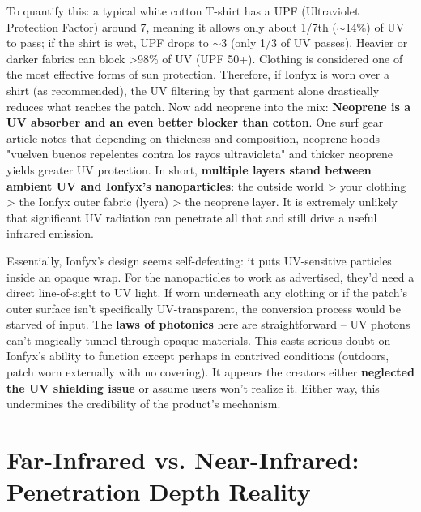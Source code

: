 \documentclass{article}
\begin{document}
To quantify this: a typical white cotton T-shirt has a UPF (Ultraviolet Protection Factor) around 7, meaning it allows only about 1/7th ($\sim$14\%) of UV to pass; if the shirt is wet, UPF drops to $\sim$3 (only 1/3 of UV passes). Heavier or darker fabrics can block >98\% of UV (UPF 50+). Clothing is considered one of the most effective forms of sun protection. Therefore, if Ionfyx is worn over a shirt (as recommended), the UV filtering by that garment alone drastically reduces what reaches the patch. Now add neoprene into the mix: \textbf{Neoprene is a UV absorber and an even better blocker than cotton}. One surf gear article notes that depending on thickness and composition, neoprene hoods "vuelven buenos repelentes contra los rayos ultravioleta" and thicker neoprene yields greater UV protection. In short, \textbf{multiple layers stand between ambient UV and Ionfyx's nanoparticles}: the outside world > your clothing > the Ionfyx outer fabric (lycra) > the neoprene layer. It is extremely unlikely that significant UV radiation can penetrate all that and still drive a useful infrared emission.

Essentially, Ionfyx's design seems self-defeating: it puts UV-sensitive particles inside an opaque wrap. For the nanoparticles to work as advertised, they'd need a direct line-of-sight to UV light. If worn underneath any clothing or if the patch's outer surface isn't specifically UV-transparent, the conversion process would be starved of input. The \textbf{laws of photonics} here are straightforward – UV photons can't magically tunnel through opaque materials. This casts serious doubt on Ionfyx's ability to function except perhaps in contrived conditions (outdoors, patch worn externally with no covering). It appears the creators either \textbf{neglected the UV shielding issue} or assume users won't realize it. Either way, this undermines the credibility of the product's mechanism.

\section{Far-Infrared vs. Near-Infrared: Penetration Depth Reality}
\end{document}
